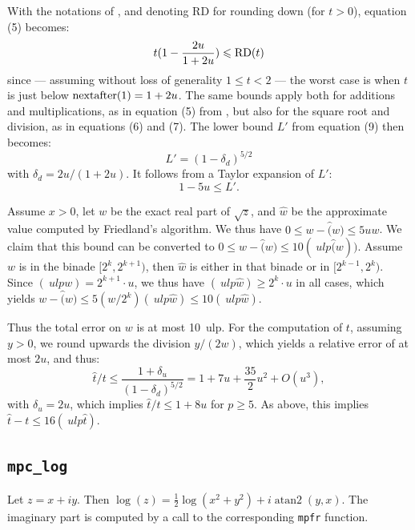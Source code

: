 \documentclass [11pt]{article}
\newcommand {\mpfr}{{\tt mpfr}}
\newcommand {\ulp}[1]{#1~ulp}
\newcommand {\atantwo}{\operatorname {atan2}}
\renewcommand {\leq}{\leqslant}
\renewcommand {\geq}{\geqslant}
\begin{document}
With the notations of \cite{jeannerod:ensl-01780265}, and denoting RD for
rounding down (for $t > 0$), equation (5) becomes:
\[ t (1 - \frac{2u}{1+2u}) \leq {\rm RD}(t) \]
since --- assuming without loss of generality $1 \leq t < 2$ ---
the worst case is when $t$ is just below ${\rm nextafter}(1) = 1+2u$.
The same bounds apply both for additions and multiplications, as in equation (5)
from \cite{jeannerod:ensl-01780265}, but also for the square root and division,
as in equations (6) and (7).
The lower bound $L'$ from equation (9) then becomes:
\[ L' = (1 - \delta_d)^{5/2} \] %
with $\delta_d = 2u/(1+2u)$. %
It follows from a Taylor expansion of $L'$:
\[ 1 - 5u \leq L'. \]

Assume $x > 0$, let $w$ be the exact real part of
$\sqrt{z}$, and $\hat{w}$ be the approximate value computed by
Friedland's algorithm.
We thus have $0 \leq w - \hat(w) \leq 5 u w$.
We claim that this bound can be converted to
$0 \leq w - \hat(w) \leq 10 \ulp(\hat(w))$.
Assume $w$ is in the binade $[2^k,2^{k+1})$, then $\hat{w}$ is either in that
binade or in $[2^{k-1},2^k)$.
Since $\ulp(w) = 2^{k+1} \cdot u$, we thus have $\ulp(\hat{w}) \geq 2^k \cdot u$ in
all cases, which yields $w - \hat(w) \leq 5 (w/2^k) \ulp(\hat{w}) \leq 10 \ulp(\hat{w})$.

Thus the total error on $w$ is at most \ulp{10}.
For the computation of $t$, assuming $y > 0$, we round upwards the division $y/(2w)$,
which yields a relative error of at most $2u$, and thus:
\[ \hat{t}/t \leq \frac{1 + \delta_u}{(1 - \delta_d)^{5/2}} = 1 + 7u + \frac{35}{2} u^2 + O(u^3), \]
with $\delta_u = 2u$,
which implies $\hat{t}/t \leq 1 + 8u$ for $p \geq 5$.
As above, this implies $\hat{t} - t \leq 16 \ulp(\hat{t})$.

\subsection {\texttt {mpc\_log}}

Let $z = x + i y$. Then $\log (z) = \frac {1}{2} \log (x^2 + y^2) + i \atantwo (y, x)$. The imaginary part is computed by a call to the corresponding {\mpfr} function.
\end{document}
